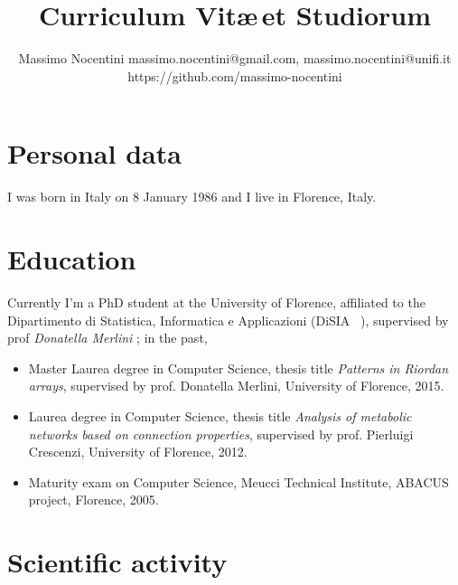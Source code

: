 \documentclass[a4paper]{tufte-handout}
\begin{document}
    \title{Curriculum Vit\ae\,et Studiorum}

    \author{Massimo Nocentini\newline
        \small{{massimo.nocentini@gmail.com}},
        \small{{massimo.nocentini@unifi.it}}\newline
        \small{{https://github.com/massimo-nocentini}}
    }

    \maketitle

    \section{Personal data}
    
    I was born in Italy on 8 January 1986 and I live in Florence, Italy. 

    \section{Education}

    Currently I'm a PhD student at the University of Florence, affiliated to the
    Dipartimento di Statistica, Informatica e Applicazioni (DiSIA~
    ), supervised by prof
    \textit{Donatella Merlini}
    ; in the past,

    \begin{itemize}
        \item Master Laurea degree in Computer Science, thesis title \emph{Patterns in Riordan arrays}, 
            supervised by prof. Donatella Merlini, University of Florence, 2015.
        \item Laurea degree in Computer Science, thesis title \emph{Analysis of metabolic networks based on connection properties}, 
            supervised by prof. Pierluigi Crescenzi, University of Florence, 2012.
        \item Maturity exam on Computer Science, Meucci Technical Institute, ABACUS project, Florence, 2005.
    \end{itemize}

    \section{Scientific activity}
    
\end{document}
